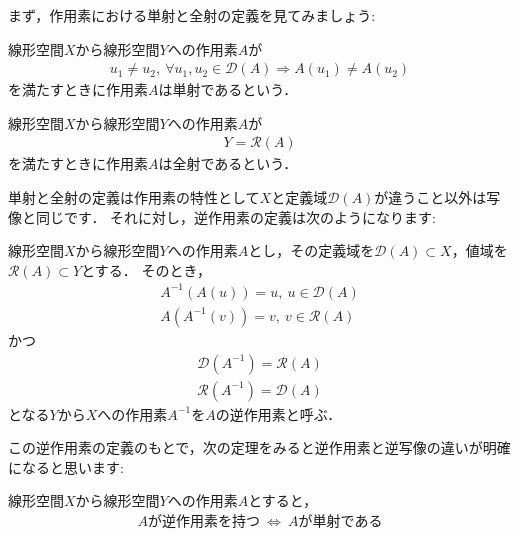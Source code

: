 まず，作用素における単射と全射の定義を見てみましょう:

\begin{defi}[単射]\label{def:inj_operator}
線形空間$X$から線形空間$Y$への作用素$A$が
\begin{align*}
u_1 \neq u_2, ~ \forall u_1, u_2 \in {\mathcal D}(A) \Rightarrow A( u_1 ) \neq A( u_2 )
\end{align*}
を満たすときに作用素$A$は単射であるという．
\end{defi}

\begin{defi}[全射]\label{def:sur_operator}
線形空間$X$から線形空間$Y$への作用素$A$が
\begin{align*}
Y = {\mathcal R}(A)
\end{align*}
を満たすときに作用素$A$は全射であるという．
\end{defi}

単射と全射の定義は作用素の特性として$X$と定義域${\mathcal D}(A)$が違うこと以外は写像と同じです．
それに対し，逆作用素の定義は次のようになります:

\begin{defi}[逆作用素]\label{def:inv_operator}
線形空間$X$から線形空間$Y$への作用素$A$とし，その定義域を${\mathcal D}(A) \subset X$，値域を${\mathcal R}(A) \subset Y$とする．
そのとき，
\begin{align*}
A^{-1} (A (u)) = u , ~ u \in {\mathcal D}( A ) \\
A (A^{-1}  (v)) = v , ~ v \in {\mathcal R}( A )
\end{align*}
かつ
\begin{align*}
  {\mathcal D}(A^{-1}) = {\mathcal R}(A) \\
  {\mathcal R}(A^{-1}) = {\mathcal D}(A)
\end{align*}
となる$Y$から$X$への作用素$A^{-1}$を$A$の逆作用素と呼ぶ．
\end{defi}

この逆作用素の定義のもとで，次の定理をみると逆作用素と逆写像の違いが明確になると思います:

\begin{Thm}[単射と逆作用素の関係]\label{thm:inj_inve}
  線形空間$X$から線形空間$Y$への作用素$A$とすると，
\begin{align*}
  A\mbox{が逆作用素を持つ} ~ \Leftrightarrow ~ A\mbox{が単射である}
\end{align*}
\end{Thm}

